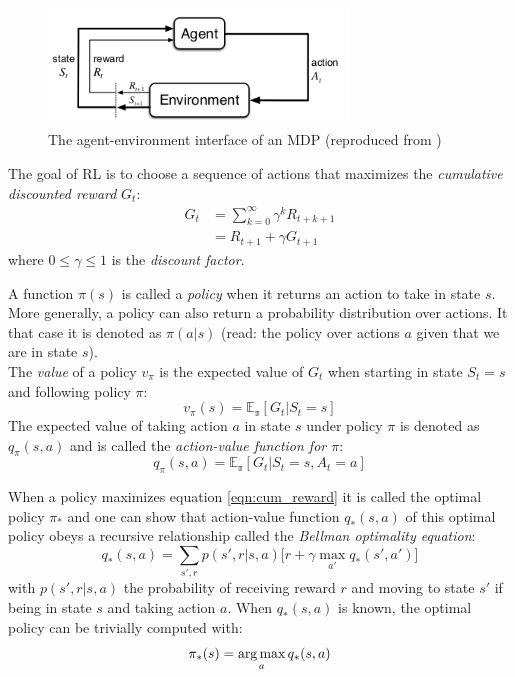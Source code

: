 \begin{figure}[htp]
    \centering
    \includegraphics[width=8cm]{images/mdp.png}
    \caption{The agent-environment interface of an MDP (reproduced from \cite{sutton2018reinforcement})}
    \label{fig:mdp}
\end{figure}

The goal of RL is to choose a sequence of actions that maximizes the \emph{cumulative discounted reward} $G_t$:
\begin{equation}
\begin{split}
    G_t &= \sum_{k=0}^{\infty} \gamma^k R_{t+k+1} \\
        &= R_{t+1} + \gamma G_{t+1}
\end{split}
\label{eqn:cum_reward}
\end{equation}
where $0 \leqslant \gamma \leqslant 1$ is the \emph{discount factor}.

A function $\pi(s)$ is called a \emph{policy} when it returns an action to take in state $s$. More generally, a policy can also return a probability distribution over actions. It that case it is denoted as $\pi(a|s)$ (read: the policy over actions $a$ given that we are in state $s$).\\

The \emph{value} of a policy $v_{\pi}$ is the expected value of $G_t$ when starting in state $S_t=s$ and following policy $\pi$:
\begin{equation}
    v_{\pi}(s) = \mathbb{E_{\pi}}[G_t | S_t=s]
\end{equation}
The expected value of taking action $a$ in state $s$ under policy $\pi$ is denoted as $q_{\pi}(s,a)$ and is called the \emph{action-value function for $\pi$}:
\begin{equation}
    q_{\pi}(s,a) = \mathbb{E_{\pi}}[G_t | S_t=s, A_t = a]
\end{equation}

When a policy maximizes equation \ref{eqn:cum_reward} it is called the optimal policy $\pi_{*}$ and one can show that action-value function $q_{*}(s, a)$ of this optimal policy obeys a recursive relationship called the \emph{Bellman optimality equation}:
\begin{equation}
    q_{*}(s,a) = \sum_{s', r} p(s', r | s, a) \big[r + \gamma \max_{a'} q_{*}(s', a') \big]
    \label{eqn:bellman}
\end{equation}
with $p(s', r | s, a)$ the probability of receiving reward $r$ and moving to state $s'$ if being in state $s$ and taking action $a$. When $q_{*}(s,a)$ is known, the optimal policy can be trivially computed with:
\begin{equation}
    \pi_{*}(s) = \operatorname*{arg\,max}_{a} q_{*}(s, a)
    \label{eq:optimal_policy}
\end{equation}

